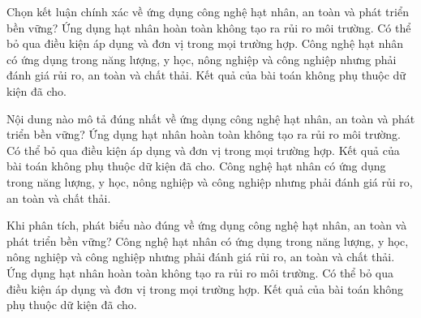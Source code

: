 \begin{ex}
Chọn kết luận chính xác về ứng dụng công nghệ hạt nhân, an toàn và phát triển bền vững?
\choice
{Ứng dụng hạt nhân hoàn toàn không tạo ra rủi ro môi trường.}
{Có thể bỏ qua điều kiện áp dụng và đơn vị trong mọi trường hợp.}
{\True Công nghệ hạt nhân có ứng dụng trong năng lượng, y học, nông nghiệp và công nghiệp nhưng phải đánh giá rủi ro, an toàn và chất thải.}
{Kết quả của bài toán không phụ thuộc dữ kiện đã cho.}
\end{ex}

\begin{ex}
Nội dung nào mô tả đúng nhất về ứng dụng công nghệ hạt nhân, an toàn và phát triển bền vững?
\choice
{Ứng dụng hạt nhân hoàn toàn không tạo ra rủi ro môi trường.}
{Có thể bỏ qua điều kiện áp dụng và đơn vị trong mọi trường hợp.}
{Kết quả của bài toán không phụ thuộc dữ kiện đã cho.}
{\True Công nghệ hạt nhân có ứng dụng trong năng lượng, y học, nông nghiệp và công nghiệp nhưng phải đánh giá rủi ro, an toàn và chất thải.}
\end{ex}

\begin{ex}
Khi phân tích, phát biểu nào đúng về ứng dụng công nghệ hạt nhân, an toàn và phát triển bền vững?
\choice
{\True Công nghệ hạt nhân có ứng dụng trong năng lượng, y học, nông nghiệp và công nghiệp nhưng phải đánh giá rủi ro, an toàn và chất thải.}
{Ứng dụng hạt nhân hoàn toàn không tạo ra rủi ro môi trường.}
{Có thể bỏ qua điều kiện áp dụng và đơn vị trong mọi trường hợp.}
{Kết quả của bài toán không phụ thuộc dữ kiện đã cho.}
\end{ex}

